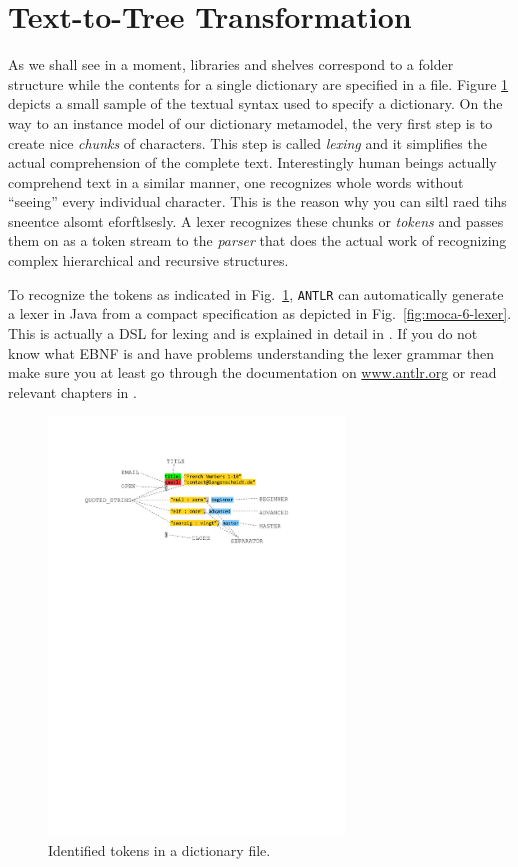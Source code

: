 \section{Text-to-Tree Transformation}

As we shall see in a moment, libraries and shelves correspond to a folder structure while the contents for a single dictionary are specified in a file.
Figure \ref{fig:moca-4-Tokens} depicts a small sample of the textual syntax used to specify a dictionary.
On the way to an instance model of our dictionary metamodel, the very first step is to create nice \emph{chunks} of characters.
This step is called \emph{lexing} and it simplifies the actual comprehension of the complete text.
Interestingly human beings actually comprehend text in a similar manner, one recognizes whole words without ``seeing'' every individual character.
This is the reason why you can siltl raed tihs sneentce alsomt eforftlsesly.   
A lexer recognizes these chunks or \emph{tokens} and passes them on as a token stream to the \emph{parser} that does the actual work of recognizing complex hierarchical and recursive structures.   
   
To recognize the tokens as indicated in Fig.~\ref{fig:moca-4-Tokens}, \texttt{ANTLR} can automatically generate a lexer in Java from a compact specification as depicted in Fig.~\ref{fig:moca-6-lexer}.
This is actually a DSL for lexing and is explained in detail in \cite{ANTLR}.
If you do not know what EBNF is and have problems understanding the lexer grammar then make sure you at least go through the documentation on \url{www.antlr.org} or read relevant chapters in \cite{ANTLR}.

\begin{figure}[!htbp]
\begin{center}
 \includegraphics[width=0.7\textwidth]{pics/moca/2TextToMocaTree/4-tokens}
  \caption{Identified tokens in a dictionary file.}
  \label{fig:moca-4-Tokens}
\end{center}
\end{figure}


